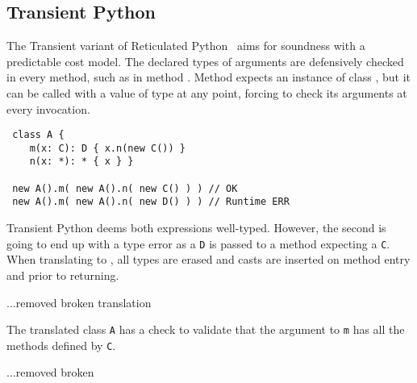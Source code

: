 \documentclass[acmlarge, anonymous, authordraft]{acmart}
\newcommand{\code}[1]{{\tt #1}\xspace}
\begin{document}
\subsection{Transient Python}

The Transient variant of Reticulated Python~\cite{siek14} aims for soundness
with a predictable cost model. The declared types of arguments are defensively
checked in every method, such as in method \m. Method \m expects an instance of
class \C, but it can be called with a value of type \any at any point, forcing
\m to check its arguments at every invocation.

\begin{lstlisting}
 class A {
    m(x: C): D { x.n(new C()) }
    n(x: *): * { x } }

 new A().m( new A().n( new C() ) ) // OK
 new A().m( new A().n( new D() ) ) // Runtime ERR
\end{lstlisting}

\noindent Transient Python deems both expressions well-typed. However, the
second is going to end up with a type error as a \code D is passed to a method
expecting a \code C.  When translating to \kafka, all types are erased and casts
are inserted on method entry and prior to returning.

...removed broken translation 

\noindent The translated class \code A has a check to validate that the
argument to \code m has all the methods defined by \code C.

...removed broken
\end{document}
